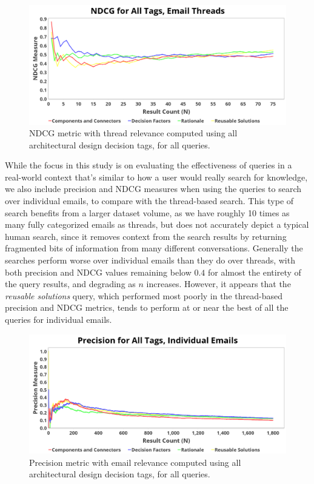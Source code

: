 \documentclass[a4paper, 12pt]{article}
\begin{document}
		\begin{figure}
			\centering
			\includegraphics[width=\textwidth]{report/all_tags_thread_ndcg.png}
			\caption{NDCG metric with thread relevance computed using all architectural design decision tags, for all queries.}
			\label{fig:ndcgall}
		\end{figure}
	
		While the focus in this study is on evaluating the effectiveness of queries in a real-world context that's similar to how a user would really search for knowledge, we also include precision and NDCG measures when using the queries to search over individual emails, to compare with the thread-based search. This type of search benefits from a larger dataset volume, as we have roughly 10 times as many fully categorized emails as threads, but does not accurately depict a typical human search, since it removes context from the search results by returning fragmented bits of information from many different conversations. Generally the searches perform worse over individual emails than they do over threads, with both precision and NDCG values remaining below $ 0.4 $ for almost the entirety of the query results, and degrading as $ n $ increases. However, it appears that the \textit{reusable solutions} query, which performed most poorly in the thread-based precision and NDCG metrics, tends to perform at or near the best of all the queries for individual emails.
		
		\begin{figure}
			\centering
			\includegraphics[width=\textwidth]{report/all_tags_email_precision.png}
			\caption{Precision metric with email relevance computed using all architectural design decision tags, for all queries.}
			\label{fig:precisionemailall}
		\end{figure}
		
\end{document}
